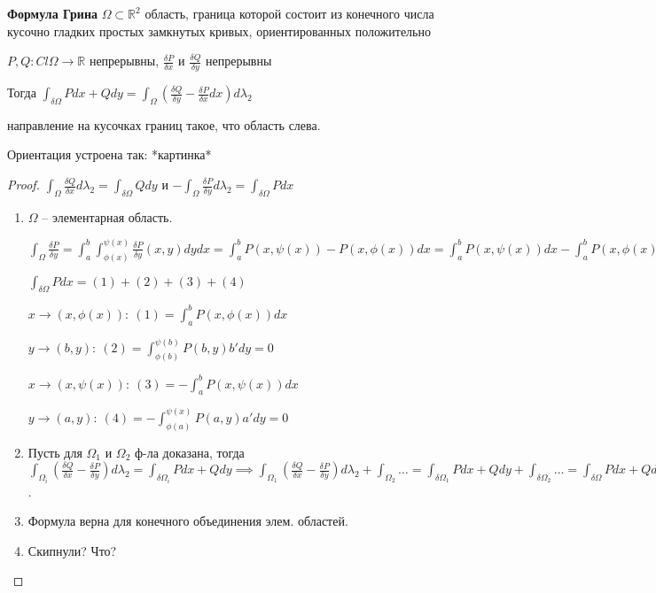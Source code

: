 \begin{theorem}\textbf{Формула Грина}
    $\Omega \subset \mathbb{R}^2$ область, граница которой состоит из конечного числа кусочно гладких простых замкнутых кривых, ориентированных положительно

    $P, Q: Cl \Omega \to \mathbb{R}$ непрерывны, $\frac{\delta P}{\delta x}$ и $\frac{\delta Q}{\delta y}$ непрерывны 

    Тогда $\int_{\delta \Omega}^{}Pdx + Qdy = \int_{\Omega}^{}(\frac{\delta Q}{\delta y} - \frac{\delta P}{\delta x}dx) d\lambda_2$

    направление на кусочках границ такое, что область слева.

    Ориентация устроена так: *картинка*
\end{theorem}
\begin{proof}
    $\int_{\Omega} { \frac{\delta Q}{\delta x} d \lambda_2 } = \int_{\delta \Omega} {Q dy}$ и $-\int_{\Omega} {\frac{\delta P}{\delta y} d \lambda_2} = \int_{\delta \Omega} {P dx}$

    \begin{enumerate}
        \item {
            $\Omega$ -- элементарная область.

            $\int_{\Omega} {\frac{\delta P}{\delta y}} = \int_{a}^{b} { \int_{\phi(x)}^{\psi(x)} {\frac{\delta P}{\delta y} (x, y) dy} dx} = \int_{a}^{b} { P(x, \psi(x)) - P(x, \phi(x)) dx } = \int_{a}^{b} { P(x, \psi(x)) dx } - \int_{a}^{b} { P(x, \phi(x)) dx }$

            $\int_{\delta \Omega} { P dx } = (1) + (2) + (3) + (4)$

            $x\rightarrow (x, \phi(x)): \ (1) = \int_{a}^{b} { P(x, \phi(x)) dx}$

            $y \rightarrow (b, y): \ (2) = \int_{\phi(b)}^{\psi(b)} { P(b, y) b' dy } = 0$

            $x \rightarrow (x, \psi(x)): \ (3) = -\int_{a}^{b} { P(x, \psi(x)) dx}$

            $y \rightarrow (a, y): \ (4) = - \int_{\phi(a)}^{\psi(x)} { P(a, y) a' dy } = 0$
        }
        \item {
            Пусть для $\Omega_1$ и $\Omega_2$ ф-ла доказана, тогда $\int_{\Omega_i} { \left( \frac{\delta  Q}{ \delta x} - \frac{\delta P}{\delta y} \right) d\lambda_2 } = \int_{\delta \Omega_i} { P d x + Q dy } \implies \int_{\Omega_1} { \left( \frac{\delta  Q}{ \delta x} - \frac{\delta P}{\delta y} \right) d\lambda_2 } + \int_{\Omega_2} { \dots } = \int_{\delta \Omega_1} { Pdx + Qdy } + \int_{\delta \Omega_2} { \dots } = \int_{\delta \Omega} { P d x + Q d y } = \int_{\Omega} { \left( \frac{\delta  Q}{ \delta x} - \frac{\delta P}{\delta y} \right) }$.
        }
        \item {
            Формула верна для конечного объединения элем. областей.
        }
        \item {
            Скипнули? Что?
        }
    \end{enumerate}
\end{proof}
